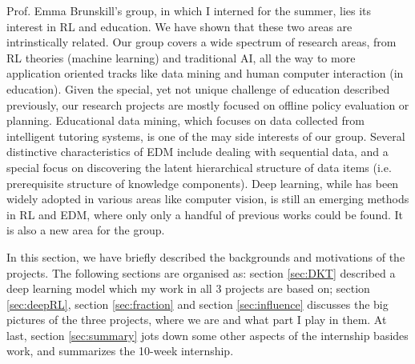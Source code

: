 Prof. Emma Brunskill's group, in which I interned for the summer, lies its interest in RL and education. We have shown that these two areas are intrinstically related. Our group covers a wide spectrum of research areas, from RL theories (machine learning) and traditional AI, all the way to more application oriented tracks like data mining and human computer interaction (in education). Given the special, yet not unique challenge of education described previously, our research projects are mostly focused on offline policy evaluation or planning. Educational data mining, which focuses on data collected from intelligent tutoring systems, is one of the may side interests of our group. Several distinctive characteristics of EDM include dealing with sequential data, and a special focus on discovering the latent hierarchical structure of data items (i.e. prerequisite structure of knowledge components). Deep learning, while has been widely adopted in various areas like computer vision, is still an emerging methods in RL and EDM, where only only a handful of previous works could be found. It is also a new area for the group.

In this section, we have briefly described the backgrounds and motivations of the projects. The following sections are organised as: section \ref{sec:DKT} described a deep learning model which my work in all 3 projects are based on; section \ref{sec:deepRL}, section \ref{sec:fraction} and section \ref{sec:influence} discusses the big pictures of the three projects, where we are and what part I play in them. At last, section \ref{sec:summary} jots down some other aspects of the internship basides work, and summarizes the 10-week internship.









